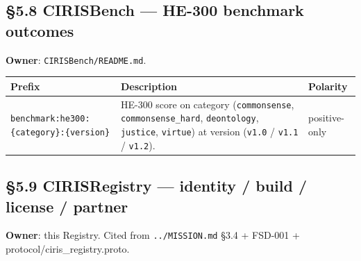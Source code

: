 \documentclass[11pt]{article}
\begin{document}
\subsection*{§5.8 CIRISBench — HE-300 benchmark outcomes}


\textbf{Owner}: \texttt{CIRISBench/README.md}.


{\footnotesize
\begin{longtable}{|p{5.33cm}|p{5.33cm}|p{5.33cm}|}\hline
\textbf{Prefix} & \textbf{Description} & \textbf{Polarity} \\ \hline\endhead
\texttt{benchmark:he300:\{category\}:\{version\}} & HE-300 score on category (\texttt{commonsense}, \texttt{commonsense\_hard}, \texttt{deontology}, \texttt{justice}, \texttt{virtue}) at version (\texttt{v1.0} / \texttt{v1.1} / \texttt{v1.2}). & positive-only \\ \hline
\end{longtable}}


\subsection*{§5.9 CIRISRegistry — identity / build / license / partner}


\textbf{Owner}: this Registry. Cited from \texttt{../MISSION.md} §3.4 + FSD-001 + protocol/ciris\_registry.proto.
\end{document}
